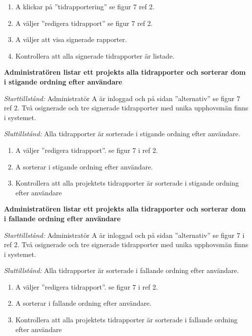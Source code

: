 \documentclass[a4paper]{article}
\begin{document}
\begin{FT}
\begin{enumerate}
\item A klickar på ''tidrapportering'' se figur 7 ref 2.
\item A väljer ''redigera tidrapport'' se figur 7 ref 2.
\item A väljer att visa signerade rapporter.
\item Kontrollera att alla signerade tidrapporter är listade.
\end{enumerate}

\item %
\textbf{Administratören listar ett projekts alla tidrapporter och sorterar dom i stigande ordning efter användare}

\emph{Starttillstånd:} Administratör A är inloggad och på sidan ''alternativ'' se figur 7 ref 2. Två osignerade och tre signerade tidrapporter med unika upphovsmän finns i systemet.

\emph{Sluttillstånd:} Alla tidrapporter är sorterade i stigande ordning efter användare.

\begin{enumerate}
\item A väljer ''redigera tidrapport''. se figur 7 i ref 2.
\item A sorterar i stigande ordning efter användare.
\item Kontrollera att alla projektets tidrapporter är sorterade i stigande ordning efter användare
\end{enumerate}

\item %
\textbf{Administratören listar ett projekts alla tidrapporter och sorterar dom i fallande ordning efter användare}

\emph{Starttillstånd:} Administratör A är inloggad och på sidan ''alternativ'' se figur 7 i ref 2. Två osignerade och tre signerade tidrapporter med unika upphovsmän finns i systemet.

\emph{Sluttillstånd:} Alla tidrapporter är sorterade i fallande ordning efter användare.

\begin{enumerate}
\item A väljer ''redigera tidrapport''. se figur 7 i ref 2.
\item A sorterar i fallande ordning efter användare.
\item Kontrollera att alla projektets tidrapporter är sorterade i fallande ordning efter användare
\end{enumerate}


\end{FT}
\end{document}
